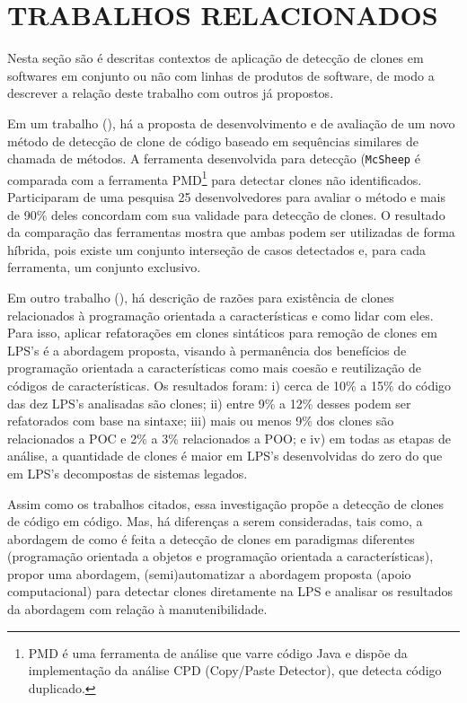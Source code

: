 \chapter{TRABALHOS RELACIONADOS	}
\label{cap:trabalhosrelacionados}

Nesta seção são é descritas contextos de aplicação de detecção de clones em softwares em conjunto ou não com linhas de produtos de software, de modo a descrever a relação deste trabalho com outros já propostos.


Em um trabalho (\cite{alexandremartinspaiva2016}), há a proposta de desenvolvimento e de avaliação de um novo método de detecção de clone de código baseado em sequências similares de chamada de métodos. A ferramenta desenvolvida para detecção (\texttt{McSheep} é comparada com a ferramenta PMD\footnote{PMD é uma ferramenta de análise que varre código Java e dispõe da implementação da análise CPD (Copy/Paste Detector), que detecta código duplicado.} para detectar clones não identificados. Participaram de uma pesquisa 25 desenvolvedores para avaliar o método e mais de 90\% deles concordam com sua validade para detecção de clones. O resultado da comparação das ferramentas mostra que ambas podem ser utilizadas de forma híbrida, pois existe um conjunto interseção de casos detectados e, para cada ferramenta, um conjunto exclusivo.

Em outro trabalho (\cite{Schulze2011a}), há descrição de razões para existência de clones relacionados à programação orientada a características e como lidar com eles. Para isso, aplicar refatorações em clones sintáticos para remoção de clones em LPS's é a abordagem proposta, visando à permanência dos benefícios de programação orientada a características como mais coesão e reutilização de códigos de características. Os resultados foram: i) cerca de 10\% a 15\% do código das dez LPS's analisadas são clones; ii) entre 9\% a 12\% desses podem ser refatorados com base na sintaxe; iii) mais ou menos 9\% dos clones são relacionados a POC e 2\% a 3\% relacionados a POO; e iv) em todas as etapas de análise, a quantidade de clones é maior em LPS's desenvolvidas do zero do que em LPS's decompostas de sistemas legados.

Assim como os trabalhos citados, essa investigação propõe a detecção de clones de código em código. Mas, há diferenças a serem consideradas, tais como, a abordagem de como é feita a detecção de clones em paradigmas diferentes (programação orientada a objetos e programação orientada a características), propor uma abordagem, (semi)automatizar a abordagem proposta (apoio computacional) para detectar clones diretamente na LPS e analisar os resultados da abordagem com relação à manutenibilidade.